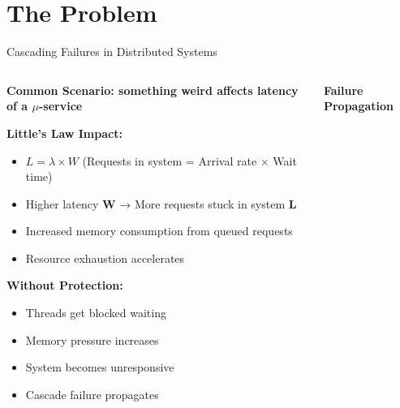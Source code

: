 \documentclass[aspectratio=169]{beamer}
\newcommand{\alertred}[1]{\textcolor{red}{#1}}
\begin{document}
\section{The Problem}

\begin{frame}{Cascading Failures in Distributed Systems}
    \begin{columns}
        \begin{column}{0.7\textwidth}
            \textbf{Common Scenario: something weird affects latency of a $\mu$-service}
            
            \vspace{0.3cm}
            \textbf{Little's Law Impact:}
            \begin{itemize}
                \item \textcolor{geniusblue}{$L = \lambda × W$} (Requests in system = Arrival rate × Wait time)
                \item Higher latency \textbf{W} → More requests stuck in system \textbf{L}
                \item Increased memory consumption from queued requests
                \item Resource exhaustion accelerates
            \end{itemize}
            
            \vspace{0.3cm}
            \textbf{Without Protection:}
            \begin{itemize}
                \item[\alertred{\faTimes}] Threads get blocked waiting
                \item[\alertred{\faTimes}] Memory pressure increases
                \item[\alertred{\faTimes}] System becomes unresponsive
                \item[\alertred{\faTimes}] Cascade failure propagates
            \end{itemize}
        \end{column}
     \hspace{-0.25\textwidth}
        \begin{column}{0.4\textwidth}
            \begin{center}
                \textbf{Failure Propagation}
\end{center}
\end{column}
\end{columns}
\end{frame}
\end{document}
